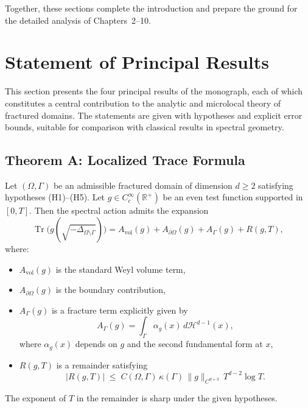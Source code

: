 Together, these sections complete the introduction and prepare the ground
for the detailed analysis of Chapters~2--10.


\section{Statement of Principal Results}

This section presents the four principal results of the monograph, each of which
constitutes a central contribution to the analytic and microlocal theory of
fractured domains. The statements are given with hypotheses and explicit error
bounds, suitable for comparison with classical results in spectral geometry.

\subsection{Theorem A: Localized Trace Formula}

\begin{theoremA}
Let $(\Omega,\Gamma)$ be an admissible fractured domain of dimension $d\geq 2$
satisfying hypotheses (H1)--(H5). Let $g\in C_c^\infty(\mathbb{R}^+)$ be an even
test function supported in $[0,T]$. Then the spectral action admits the expansion
\[
\operatorname{Tr}\!\bigl(g(\sqrt{-\Delta_{\Omega\setminus\Gamma}})\bigr)
= A_{\mathrm{vol}}(g) + A_{\partial\Omega}(g) + A_\Gamma(g) + R(g,T),
\]
where:
\begin{itemize}
  \item $A_{\mathrm{vol}}(g)$ is the standard Weyl volume term,
  \item $A_{\partial\Omega}(g)$ is the boundary contribution,
  \item $A_\Gamma(g)$ is a fracture term explicitly given by
  \[
  A_\Gamma(g) = \int_\Gamma \alpha_g(x) \, d\mathcal{H}^{d-1}(x),
  \]
  where $\alpha_g(x)$ depends on $g$ and the second fundamental form at $x$,
  \item $R(g,T)$ is a remainder satisfying
  \[
  |R(g,T)| \;\leq\; C(\Omega,\Gamma)\,\kappa(\Gamma)\,
  \|g\|_{C^{d+3}}\, T^{d-2}\log T.
  \]
\end{itemize}
The exponent of $T$ in the remainder is sharp under the given hypotheses.
\end{theoremA}

